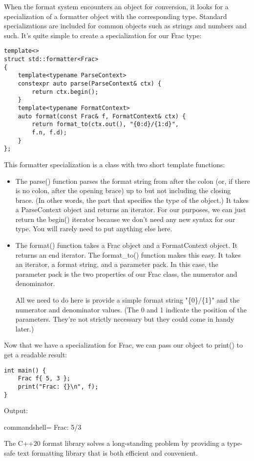When the format system encounters an object for conversion, it looks for a specialization of a formatter object with the corresponding type. Standard specializations are included for common objects such as strings and numbers and such.
It's quite simple to create a specialization for our Frac type:

\begin{lstlisting}[style=styleCXX]
template<>
struct std::formatter<Frac>
{
	template<typename ParseContext>
	constexpr auto parse(ParseContext& ctx) {
		return ctx.begin();
	}
	template<typename FormatContext>
	auto format(const Frac& f, FormatContext& ctx) {
		return format_to(ctx.out(), "{0:d}/{1:d}",
		f.n, f.d);
	}
};
\end{lstlisting}

This formatter specialization is a class with two short template functions:

\begin{itemize}
\item 
The parse() function parses the format string from after the colon (or, if there is no colon, after the opening brace) up to but not including the closing brace. (In other words, the part that specifies the type of the object.) It takes a ParseContext object and returns an iterator. For our purposes, we can just return the begin() iterator because we don't need any new syntax for our type. You will rarely need to put anything else here.

\item 
The format() function takes a Frac object and a FormatContext object.
It returns an end iterator. The format\_to() function makes this easy. It takes an iterator, a format string, and a parameter pack. In this case, the parameter pack is the two properties of our Frac class, the numerator and denominator.

All we need to do here is provide a simple format string "\{0\}/\{1\}" and the numerator and denominator values. (The 0 and 1 indicate the position of the parameters. They're not strictly necessary but they could come in handy later.)
\end{itemize}

Now that we have a specialization for Frac, we can pass our object to print() to get a readable result:

\begin{lstlisting}[style=styleCXX]
int main() {
	Frac f{ 5, 3 };
	print("Frac: {}\n", f);
}
\end{lstlisting}

Output:

\begin{tcblisting}{commandshell={}}
Frac: 5/3
\end{tcblisting}

The C++20 format library solves a long-standing problem by providing a type-safe text formatting library that is both efficient and convenient.

